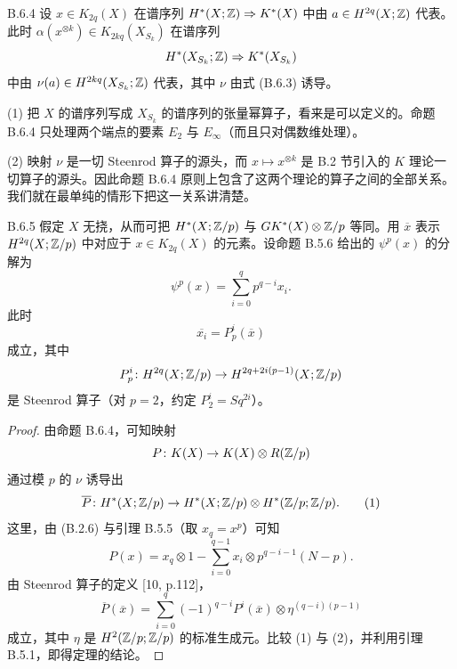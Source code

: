 \begin{proposition*}{B.6.4}
  设 $x\in K_{2q}(X)$ 在谱序列 $H^*(X;\mathbb{Z})\Rightarrow K^*(X)$ 中由 $a\in H^{2q}(X;\mathbb{Z})$ 代表。此时 $\alpha(x^{\otimes k})\in K_{2kq}(X_{S_k})$ 在谱序列
  \[
    H^*(X_{S_k};\mathbb{Z})\Rightarrow K^*(X_{S_k})
  \]
  中由 $\nu(a)\in H^{2kq}(X_{S_k};\mathbb{Z})$ 代表，其中 $\nu$ 由式 (B.6.3) 诱导。
\end{proposition*}

\begin{remark}{}
  (1) 把 $X$ 的谱序列写成 $X_{S_k}$ 的谱序列的张量幂算子，看来是可以定义的。命题 B.6.4 只处理两个端点的要素 $E_2$ 与 $E_\infty$（而且只对偶数维处理）。

  (2) 映射 $\nu$ 是一切 Steenrod 算子的源头，而 $x\mapsto x^{\otimes k}$ 是 B.2 节引入的 $K$ 理论一切算子的源头。因此命题 B.6.4 原则上包含了这两个理论的算子之间的全部关系。我们就在最单纯的情形下把这一关系讲清楚。
\end{remark}

\begin{theorem*}{B.6.5}
  假定 $X$ 无挠，从而可把 $H^*(X;\mathbb{Z}/p)$ 与 $GK^*(X)\otimes\mathbb{Z}/p$ 等同。用 $\overline{x}$ 表示 $H^{2q}(X;\mathbb{Z}/p)$ 中对应于 $x\in K_{2q}(X)$ 的元素。设命题 B.5.6 给出的 $\psi^p(x)$ 的分解为
  \[
    \psi^p(x)=\sum_{i=0}^{q}p^{q-i}x_i.
  \]
  此时
  \[
    \overline{x_i}=P^i_p(\overline{x})
  \]
  成立，其中
  \[
    P^i_p\colon H^{2q}(X;\mathbb{Z}/p)\to H^{2q+2i(p-1)}(X;\mathbb{Z}/p)
  \]
  是 Steenrod 算子（对 $p=2$，约定 $P^i_2=Sq^{2i}$）。
\end{theorem*}


\begin{proof}
  由命题 B.6.4，可知映射
  \[
    P\colon K(X)\to K(X)\otimes R(\mathbb{Z}/p)
  \]
  通过模 $p$ 的 $\nu$ 诱导出
  \begin{equation}
    \overline{P}\colon H^*(X;\mathbb{Z}/p)\to H^*(X;\mathbb{Z}/p)\otimes H^*(\mathbb{Z}/p;\mathbb{Z}/p). \tag{1}
  \end{equation}
  这里，由 (B.2.6) 与引理 B.5.5（取 $x_q=x^p$）可知
  \begin{equation}
    P(x)=x_q\otimes1-\sum_{i=0}^{q-1}x_i\otimes p^{q-i-1}(N-p). \tag{2}
  \end{equation}
  由 Steenrod 算子的定义 [10, p.112]，
  \[
    \overline{P}(\overline{x})=\sum_{i=0}^{q}(-1)^{q-i}P^i(\overline{x})\otimes\eta^{(q-i)(p-1)}
  \]
  成立，其中 $\eta$ 是 $H^2(\mathbb{Z}/p;\mathbb{Z}/p)$ 的标准生成元。比较 (1) 与 (2)，并利用引理 B.5.1，即得定理的结论。
\end{proof}

